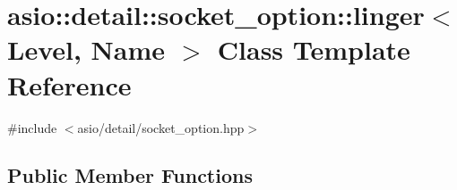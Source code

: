 \hypertarget{classasio_1_1detail_1_1socket__option_1_1linger}{}\section{asio\+:\+:detail\+:\+:socket\+\_\+option\+:\+:linger$<$ Level, Name $>$ Class Template Reference}
\label{classasio_1_1detail_1_1socket__option_1_1linger}


{\ttfamily \#include $<$asio/detail/socket\+\_\+option.\+hpp$>$}

\subsection*{Public Member Functions}
